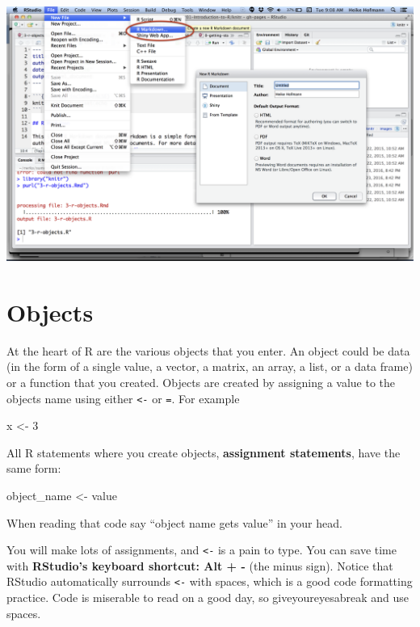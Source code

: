 \documentclass[
]{book}
\newenvironment{Shaded}{\begin{snugshade}}{\end{snugshade}}
\newcommand{\DecValTok}[1]{\textcolor[rgb]{0.00,0.00,0.81}{#1}}
\newcommand{\NormalTok}[1]{#1}
\newcommand{\OtherTok}[1]{\textcolor[rgb]{0.56,0.35,0.01}{#1}}
\begin{document}
\includegraphics[width=24in]{img/hello-rmarkdown}

\hypertarget{objects}{%
\section{Objects}\label{objects}}

At the heart of R are the various objects that you enter. An object could be data (in the form of a single value, a vector, a matrix, an array, a list, or a data frame) or a function that you created. Objects are created by assigning a value to the objects name using either \texttt{\textless{}-} or \texttt{=}. For example

\begin{Shaded}
\begin{Highlighting}[]
\NormalTok{x }\OtherTok{\textless{}{-}} \DecValTok{3}
\end{Highlighting}
\end{Shaded}

All R statements where you create objects, \textbf{assignment statements}, have the same form:

\begin{Shaded}
\begin{Highlighting}[]
\NormalTok{object\_name }\OtherTok{\textless{}{-}}\NormalTok{ value}
\end{Highlighting}
\end{Shaded}

When reading that code say ``object name gets value'' in your head.

You will make lots of assignments, and \texttt{\textless{}-} is a pain to type. You can save time with \textbf{RStudio's keyboard shortcut: Alt + -} (the minus sign). Notice that RStudio automatically surrounds \texttt{\textless{}-} with spaces, which is a good code formatting practice. Code is miserable to read on a good day, so giveyoureyesabreak and use spaces.
\end{document}
